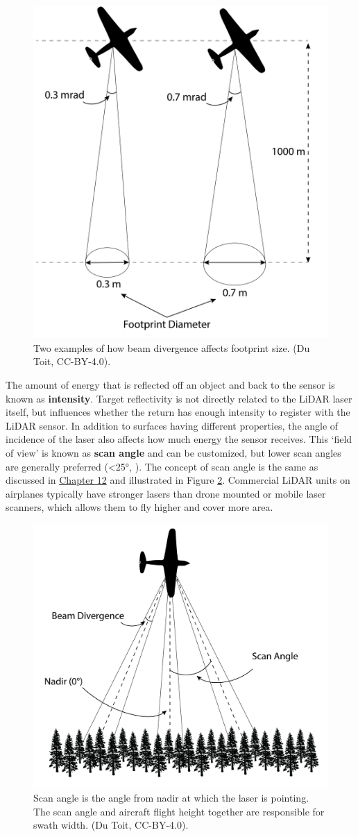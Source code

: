 \documentclass[
]{book}
\begin{document}
\begin{figure}
\includegraphics[width=0.6\linewidth]{images/15-Beam-Divergence} \caption{Two examples of how beam divergence affects footprint size. (Du Toit, CC-BY-4.0).}\label{fig:15-Beam-Divergence}
\end{figure}

The amount of energy that is reflected off an object and back to the sensor is known as \textbf{intensity}. Target reflectivity is not directly related to the LiDAR laser itself, but influences whether the return has enough intensity to register with the LiDAR sensor. In addition to surfaces having different properties, the angle of incidence of the laser also affects how much energy the sensor receives. This `field of view' is known as \textbf{scan angle} and can be customized, but lower scan angles are generally preferred (\textless25°, \citet{white_best_2013}). The concept of scan angle is the same as discussed in \href{https://ubc-geomatics-textbook.github.io/geomatics-textbook/remote-sensing-systems.html}{Chapter 12} and illustrated in Figure \ref{fig:15-Scan-Angle}. Commercial LiDAR units on airplanes typically have stronger lasers than drone mounted or mobile laser scanners, which allows them to fly higher and cover more area.

\begin{figure}
\includegraphics[width=0.6\linewidth]{images/15-Scan-Angle} \caption{Scan angle is the angle from nadir at which the laser is pointing. The scan angle and aircraft flight height together are responsible for swath width. (Du Toit, CC-BY-4.0).}\label{fig:15-Scan-Angle}
\end{figure}
\end{document}
